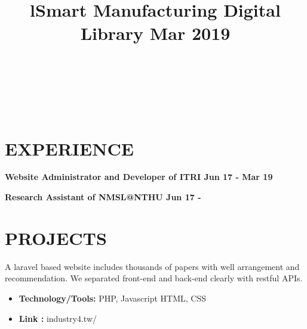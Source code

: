 \documentclass[margin]{res}
\begin{document}
\begin{resume}
\begin{format}
\title{l}\\
\\
\body\\
\end{format}

\section{EXPERIENCE}

\textbf{Website Administrator and Developer of ITRI \hfill{Jun 17 - Mar 19}\\}

\textbf{Research Assistant of NMSL@NTHU \hfill{Jun 17 - }\\}



\section{PROJECTS}
\location{}
\title{\textbf{Smart Manufacturing Digital Library \hfill Mar 2019}
 }
\begin{position}
A laravel based website includes thousands of papers with well arrangement and recommendation. We separated  front-end and back-end clearly with restful APIs.
\begin{itemize}
\item \textbf{Technology/Tools:} PHP, Javascript HTML, CSS
\end{itemize}
\begin{itemize}
\item \textbf{Link :} industry4.tw/
\end{itemize}
\end{position}


\end{resume}
\end{document}
